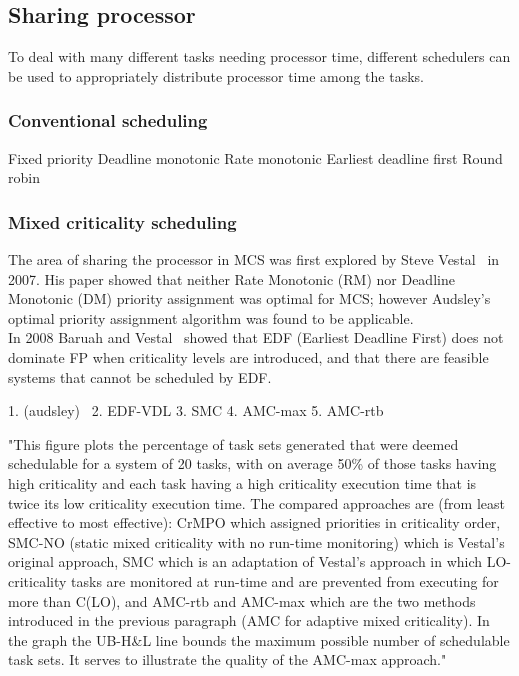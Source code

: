 \subsection{Sharing processor}
To deal with many different tasks needing processor time, different schedulers can be used to appropriately distribute processor time among the tasks.

\subsubsection{Conventional scheduling}
Fixed priority
Deadline monotonic
Rate monotonic
Earliest deadline first
Round robin

\subsubsection{Mixed criticality scheduling}
The area of sharing the processor in MCS was first explored by Steve Vestal~\cite{vestal2007} in 2007. His paper showed that neither Rate Monotonic (RM) nor Deadline Monotonic (DM) priority assignment was optimal for MCS; however Audsley’s optimal priority assignment algorithm \cite{audsley2001} was found to be applicable. \\ %

In 2008 Baruah and Vestal~\cite{baruah2008} showed that EDF (Earliest Deadline First) does not dominate FP when criticality levels are introduced, and that there are feasible systems that cannot be scheduled by EDF.

1. (audsley)~\cite{audsley2001} 2. EDF-VDL 3. SMC 4. AMC-max 5. AMC-rtb \cite{baruah2011}

"This figure plots the percentage of task sets generated that were deemed schedulable for a system of 20 tasks, with on average 50\% of those tasks having high criticality and each task having a high criticality execution time that is twice its low criticality execution time. The compared approaches are (from least effective to most effective): CrMPO which assigned priorities in criticality order, SMC-NO (static  mixed criticality with no run-time  monitoring) which  is  Vestal’s  original approach, SMC which is an adaptation of Vestal’s approach in which LO-criticality tasks are monitored at run-time and are prevented from executing for more than C(LO), and AMC-rtb and AMC-max which are the two methods introduced in the previous paragraph (AMC for adaptive mixed criticality). In the graph the UB-H\&L line bounds the maximum possible number of schedulable task sets. It serves to illustrate the quality of the AMC-max approach."~\cite{burns2016}

